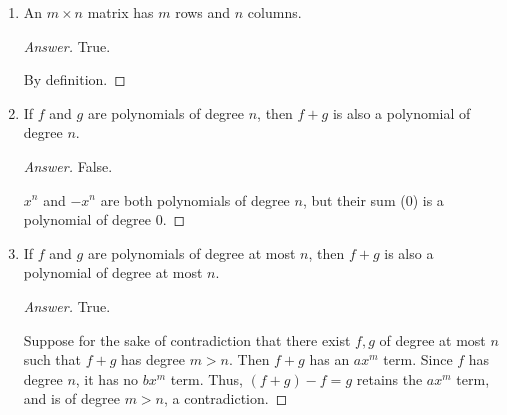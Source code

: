 \documentclass[../psets.tex]{subfiles}
\begin{document}
\begin{enumerate}[label={\textbf{1.\arabic*.}}]
\begin{enumerate}
\begin{proof}[Answer]
            False.\par
            Suppose for the sake of contradiction that $0,0'$ are two distinct zero vectors. Then
            \begin{equation*}
                0 = 0+0' = 0'
            \end{equation*}
            a contradiction.
        \end{proof}
        \item An $m\times n$ matrix has $m$ rows and $n$ columns.
        \begin{proof}[Answer]
            True.\par
            By definition.
        \end{proof}
        \item If $f$ and $g$ are polynomials of degree $n$, then $f+g$ is also a polynomial of degree $n$.
        \begin{proof}[Answer]
            False.\par
            $x^n$ and $-x^n$ are both polynomials of degree $n$, but their sum ($0$) is a polynomial of degree 0.
        \end{proof}
        \item If $f$ and $g$ are polynomials of degree at most $n$, then $f+g$ is also a polynomial of degree at most $n$.
        \begin{proof}[Answer]
            True.\par
            Suppose for the sake of contradiction that there exist $f,g$ of degree at most $n$ such that $f+g$ has degree $m>n$. Then $f+g$ has an $ax^m$ term. Since $f$ has degree $n$, it has no $bx^m$ term. Thus, $(f+g)-f=g$ retains the $ax^m$ term, and is of degree $m>n$, a contradiction.
        \end{proof}
    \end{enumerate}
\end{enumerate}
\end{document}

